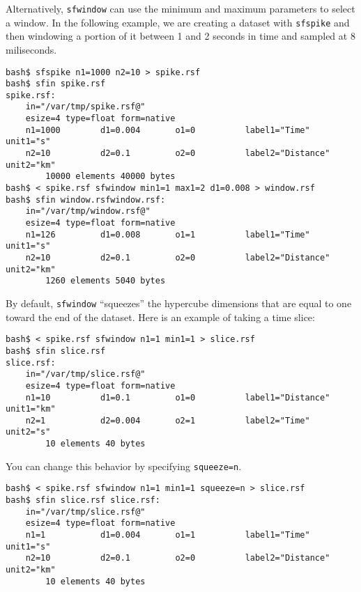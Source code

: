 Alternatively, \texttt{sfwindow} can use the minimum and maximum
parameters to select a window. In the following example, we are
creating a dataset with \texttt{sfspike} and then windowing a portion of it
between 1 and 2 seconds in time and sampled at 8 miliseconds.
\begin{verbatim}
bash$ sfspike n1=1000 n2=10 > spike.rsf         
bash$ sfin spike.rsf
spike.rsf:
    in="/var/tmp/spike.rsf@"
    esize=4 type=float form=native 
    n1=1000        d1=0.004       o1=0          label1="Time" unit1="s" 
    n2=10          d2=0.1         o2=0          label2="Distance" unit2="km" 
        10000 elements 40000 bytes
bash$ < spike.rsf sfwindow min1=1 max1=2 d1=0.008 > window.rsf
bash$ sfin window.rsfwindow.rsf:
    in="/var/tmp/window.rsf@"
    esize=4 type=float form=native 
    n1=126         d1=0.008       o1=1          label1="Time" unit1="s" 
    n2=10          d2=0.1         o2=0          label2="Distance" unit2="km" 
        1260 elements 5040 bytes
\end{verbatim}

By default, \texttt{sfwindow} ``squeezes'' the hypercube dimensions
that are equal to one toward the end of the dataset. Here is an
example of taking a time slice:
\begin{verbatim}
bash$ < spike.rsf sfwindow n1=1 min1=1 > slice.rsf
bash$ sfin slice.rsf 
slice.rsf:
    in="/var/tmp/slice.rsf@"
    esize=4 type=float form=native 
    n1=10          d1=0.1         o1=0          label1="Distance" unit1="km" 
    n2=1           d2=0.004       o2=1          label2="Time" unit2="s" 
        10 elements 40 bytes
\end{verbatim}
You can change this behavior by specifying \texttt{squeeze=n}.
\begin{verbatim}
bash$ < spike.rsf sfwindow n1=1 min1=1 squeeze=n > slice.rsf
bash$ sfin slice.rsf slice.rsf:
    in="/var/tmp/slice.rsf@"
    esize=4 type=float form=native 
    n1=1           d1=0.004       o1=1          label1="Time" unit1="s" 
    n2=10          d2=0.1         o2=0          label2="Distance" unit2="km" 
        10 elements 40 bytes
\end{verbatim}





